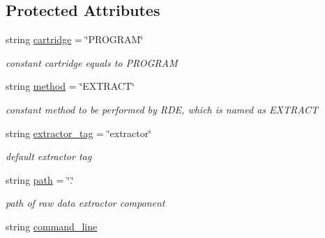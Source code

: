 \subsection*{Protected Attributes}
\begin{DoxyCompactItemize}
\item 
\mbox{\label{classRawDataExtractor_a1c6ab051ef5c78971bdd908380e1c93f}} 
string \hyperlink{classRawDataExtractor_a1c6ab051ef5c78971bdd908380e1c93f}{cartridge} = \char`\"{}P\+R\+O\+G\+R\+AM\char`\"{}
\begin{DoxyCompactList}\small\item\em constant cartridge equals to P\+R\+O\+G\+R\+AM \end{DoxyCompactList}\item 
\mbox{\label{classRawDataExtractor_a4c8121100a25e9546fca9b11f890efd5}} 
string \hyperlink{classRawDataExtractor_a4c8121100a25e9546fca9b11f890efd5}{method} = \char`\"{}E\+X\+T\+R\+A\+CT\char`\"{}
\begin{DoxyCompactList}\small\item\em constant method to be performed by R\+DE, which is named as E\+X\+T\+R\+A\+CT \end{DoxyCompactList}\item 
\mbox{\label{classRawDataExtractor_a74009c047e7981c6a8afbaad0dc34859}} 
string \hyperlink{classRawDataExtractor_a74009c047e7981c6a8afbaad0dc34859}{extractor\+\_\+tag} = \char`\"{}extractor\char`\"{}
\begin{DoxyCompactList}\small\item\em default extractor tag \end{DoxyCompactList}\item 
\mbox{\label{classRawDataExtractor_acc960f88abf7c6d64a7bf10a8ec31698}} 
string \hyperlink{classRawDataExtractor_acc960f88abf7c6d64a7bf10a8ec31698}{path} = \char`\"{}.\char`\"{}
\begin{DoxyCompactList}\small\item\em path of raw data extractor component \end{DoxyCompactList}\item 
\mbox{\label{classRawDataExtractor_a17902ee3cae7c15061ef208b11b0d300}} 
string \hyperlink{classRawDataExtractor_a17902ee3cae7c15061ef208b11b0d300}{command\+\_\+line}

\end{DoxyCompactItemize}
